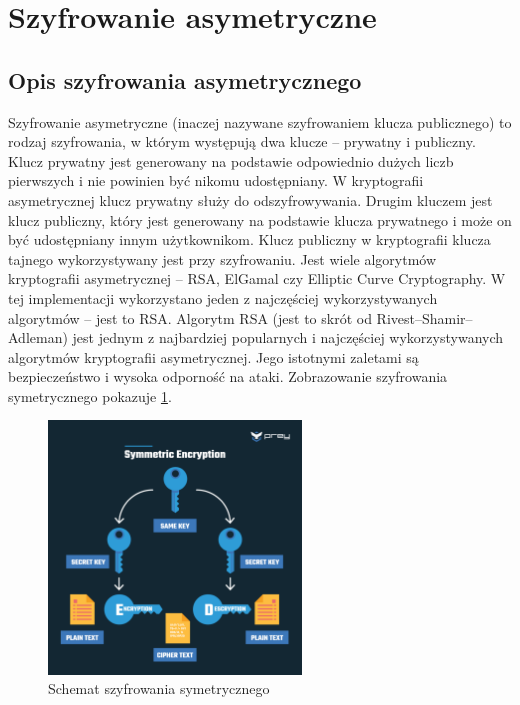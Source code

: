 \section{Szyfrowanie asymetryczne}
\label{sec:SzyfrowanieAsymetryczne}
\subsection{Opis szyfrowania asymetrycznego}
\label{ssec:SzyfrowanieAsymetryczneOpis}
Szyfrowanie asymetryczne (inaczej nazywane szyfrowaniem klucza publicznego) to rodzaj szyfrowania, w którym występują dwa klucze – prywatny i publiczny. Klucz prywatny jest generowany na podstawie odpowiednio dużych liczb pierwszych i nie powinien być nikomu udostępniany. W kryptografii asymetrycznej klucz prywatny służy do odszyfrowywania. Drugim kluczem jest klucz publiczny, który jest generowany na podstawie klucza prywatnego i może on być udostępniany innym użytkownikom. Klucz publiczny w kryptografii klucza tajnego wykorzystywany jest przy szyfrowaniu. Jest wiele algorytmów kryptografii asymetrycznej – RSA, ElGamal czy Elliptic Curve Cryptography. W tej implementacji wykorzystano jeden z najczęściej wykorzystywanych algorytmów – jest to RSA. Algorytm RSA (jest to skrót od Rivest–Shamir–Adleman) jest jednym z najbardziej popularnych i najczęściej wykorzystywanych algorytmów kryptografii asymetrycznej. Jego istotnymi zaletami są bezpieczeństwo i wysoka odporność na ataki. Zobrazowanie szyfrowania symetrycznego pokazuje \figurename{ \ref{fig:RSA1}}.
\begin{figure}[h]
    \centering
    \includegraphics[width=0.6\textwidth]{Images/RSA1.png}
    \caption{Schemat szyfrowania symetrycznego}
    \label{fig:RSA1}
\end{figure}

